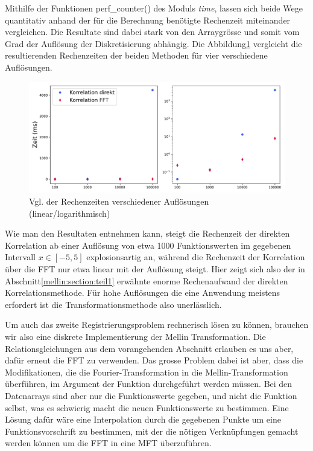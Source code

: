 Mithilfe der Funktionen perf\_counter() des Moduls {\em time}, lassen sich beide 
Wege quantitativ anhand der für die Berechnung benötigte Rechenzeit miteinander 
vergleichen.
Die Resultate sind dabei stark von den Arraygrösse und somit vom Grad der Auflösung 
der Diskretisierung abhängig.
Die Abbildung\ref{fig:mellin:zeiten} vergleicht die resultierenden Rechenzeiten 
der beiden Methoden für vier verschiedene Auflösungen.
\begin{figure}
    \centering
    \includegraphics[width=\textwidth]{papers/mellin/images/zeiten.pdf}
    \caption{Vgl. der Rechenzeiten verschiedener Auflösungen (linear/logarithmisch)}
    \label{fig:mellin:zeiten}
\end{figure}
Wie man den Resultaten entnehmen kann, steigt die Rechenzeit der direkten Korrelation
ab einer Auflösung von etwa 1000 Funktionswerten im gegebenen Intervall 
$x\in \left[-5,5\right]$ explosionsartig an, während die Rechenzeit der Korrelation 
über die FFT nur etwa linear mit der Auflösung steigt.
Hier zeigt sich also der in Abschnitt\ref{mellin:section:teil1} erwähnte enorme 
Rechenaufwand der direkten Korrelationsmethode.
Für hohe Auflösungen die eine Anwendung meistens erfordert ist die Transformationsmethode 
also unerlässlich.

Um auch das zweite Registrierungsproblem rechnerisch lösen zu können, brauchen wir also 
eine diskrete Implementierung der Mellin Transformation.
Die Relationsgleichungen aus dem vorangehenden Abschnitt erlauben es uns aber, dafür 
erneut die FFT zu verwenden.
Das grosse Problem dabei ist aber, dass die Modifikationen, die die Fourier-Transformation
in die Mellin-Transformation überführen, im Argument der Funktion durchgeführt werden 
müssen.
Bei den Datenarrays sind aber nur die Funktionswerte gegeben, und nicht die Funktion 
selbst, was es schwierig macht die neuen Funktionswerte zu bestimmen.
Eine Lösung dafür wäre eine Interpolation durch die gegebenen Punkte um eine 
Funktionsvorschrift zu bestimmen, mit der die nötigen Verknüpfungen gemacht werden 
können um die FFT in eine MFT überzuführen.






